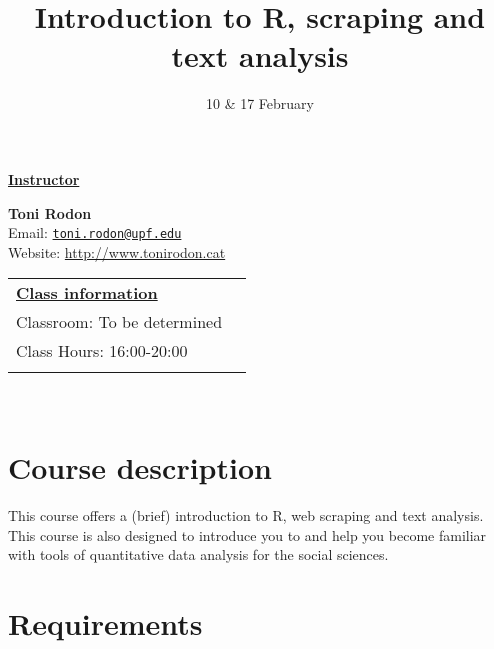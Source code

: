 \documentclass[11pt,]{article}
\title{Introduction to R, scraping and text analysis}
\date{10 \& 17 February}
\begin{document}
  

		\maketitle
		
	
		\thispagestyle{firststyle}

\textbf{\underline{Instructor}}

  \textbf{Toni Rodon}\\
  Email: \href{mailto:toni.rodon@upf.edu}{\nolinkurl{toni.rodon@upf.edu}}\\
  Website: \url{http://www.tonirodon.cat}\\
    
	
\noindent \begin{tabular*}{\textwidth}{ @{\extracolsep{\fill}} lr @{\extracolsep{\fill}}}
\textbf{\underline{Class information}}\\
  Classroom: To be determined\\
  Class Hours: 16:00-20:00\\
  \\
	\end{tabular*}\\


\vspace{2mm}


\hypertarget{course-description}{%
\section{Course description}\label{course-description}}

This course offers a (brief) introduction to R, web scraping and text
analysis. This course is also designed to introduce you to and help you
become familiar with tools of quantitative data analysis for the social
sciences.

\hypertarget{requirements}{%
\section{Requirements}\label{requirements}}
\end{document}
